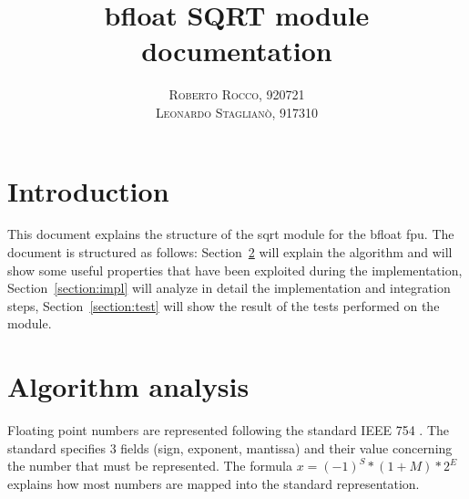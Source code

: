 \documentclass[paper=letter, fontsize=12pt]{article}
\title{\vspace{-15mm}\fontsize{24pt}{10pt}\selectfont\textbf{bfloat SQRT module documentation}}
\author{
\large{\textsc{Roberto Rocco, 920721}}\\[2mm]
\large{\textsc{Leonardo Staglianò, 917310}}\\[2mm]
}
\date{}
\begin{document}
\maketitle 
\thispagestyle{fancy}


\section{Introduction}
This document explains the structure of the sqrt module for the bfloat fpu. The document is structured as follows: Section~\ref{section:algo} will explain the algorithm and will show some useful properties that have been exploited during the implementation, Section~\ref{section:impl} will analyze in detail the implementation and integration steps, Section~\ref{section:test} will show the result of the tests performed on the module.

\section{Algorithm analysis}
\label{section:algo}
Floating point numbers are represented following the standard IEEE 754 \cite{8766229}. The standard specifies 3 fields (sign, exponent, mantissa) and their value concerning the number that must be represented. The formula \(x = (-1)^S * (1+M) * 2^E\) explains how most numbers are mapped into the standard representation.
\end{document}
